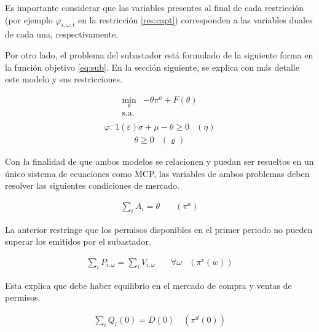 Es importante considerar que las variables presentes al final de cada restricción (por ejemplo $\varphi_{i,\omega,t}$ en la restricción \ref{res:capt}) corresponden a las variables duales de cada una, respectivamente.
\vspace{2.5mm}

Por otro lado, el problema del subastador está formulado de la siguiente forma en la función objetivo \ref{eq:sub}. En la sección siguiente, se explica con más detalle este modelo y sus restricciones.

\begin{equation}
\begin{array}{rrclcl}
    \displaystyle \min_{\theta} &-\theta \pi^a + F(\theta) \\\textrm{s.a.} \label{eq:sub}\\
\end{array}
\end{equation}
\begin{equation}
\begin{array}{cl}
    \varphi^-1 (\varepsilon )\sigma + \mu - \theta \geq 0 & (\eta) \label{res:sub1}
\end{array}
\end{equation}
\begin{equation}
\begin{array}{cl}
   \theta \geq 0 & (\varrho)\label{res:sub2}
\end{array}
\end{equation}

Con la finalidad de que ambos modelos se relacionen y puedan ser resueltos en un único sistema de ecuaciones como MCP, las variables de ambos problemas deben resolver las siguientes condiciones de mercado.

\begin{align}
   \sum_{i}A_i = \theta  &\quad (\pi^a)\label{rescom:1}
\end{align}

La anterior restringe que los permisos disponibles en el primer periodo no pueden superar los emitidos por el subastador.

\begin{align}
    \sum_{i}P_{i,\omega} = \sum_{i}V_{i,\omega} \quad& \forall \omega &(\pi^v (w))\label{rescom:2}
\end{align}
    


Esta explica que debe haber equilibrio en el mercado de compra y ventas de permisos.

\begin{align}
  \sum_{i}Q_i(0) = D(0) \quad (\pi^d (0))\label{rescom:3}  
\end{align}


